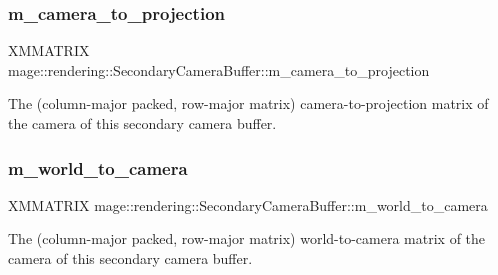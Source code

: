 \subsubsection{\texorpdfstring{m\+\_\+camera\+\_\+to\+\_\+projection}{m\_camera\_to\_projection}}
{\footnotesize\ttfamily X\+M\+M\+A\+T\+R\+IX mage\+::rendering\+::\+Secondary\+Camera\+Buffer\+::m\+\_\+camera\+\_\+to\+\_\+projection}

The (column-\/major packed, row-\/major matrix) camera-\/to-\/projection matrix of the camera of this secondary camera buffer. \mbox{\label{structmage_1_1rendering_1_1_secondary_camera_buffer_a3f131146f9374058ace582bfae3e90b7}} 
\subsubsection{\texorpdfstring{m\+\_\+world\+\_\+to\+\_\+camera}{m\_world\_to\_camera}}
{\footnotesize\ttfamily X\+M\+M\+A\+T\+R\+IX mage\+::rendering\+::\+Secondary\+Camera\+Buffer\+::m\+\_\+world\+\_\+to\+\_\+camera}

The (column-\/major packed, row-\/major matrix) world-\/to-\/camera matrix of the camera of this secondary camera buffer. 